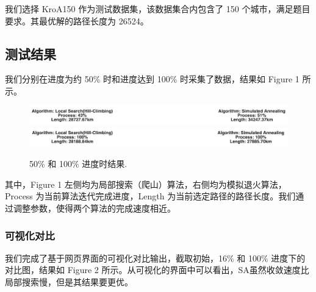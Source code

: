 我们选择 KroA150 作为测试数据集，该数据集合内包含了 150 个城市，满足题目要求。其最优解的路径长度为 26524\cite{besttsp}。

\subsection{测试结果}

我们分别在进度为约 50\% 时和进度达到 100\% 时采集了数据，结果如 Figure 1 所示。

\begin{figure}
\centering
\includegraphics[width=\textwidth]{mid.png}
\includegraphics[width=\textwidth]{final.png}
\caption{\label{fig:final}50\% 和 100\% 进度时结果.}
\end{figure}

其中，Figure 1 左侧均为局部搜索（爬山）算法，右侧均为模拟退火算法，Process 为当前算法迭代完成进度，Length 为当前选定路径的路径长度。我们通过调整参数，使得两个算法的完成速度相近。

\subsubsection{可视化对比}
我们完成了基于网页界面的可视化对比输出，截取初始，16\% 和 100\% 进度下的对比图，结果如 Figure 2 所示。从可视化的界面中可以看出，SA虽然收敛速度比局部搜索慢，但是其结果要更优。

